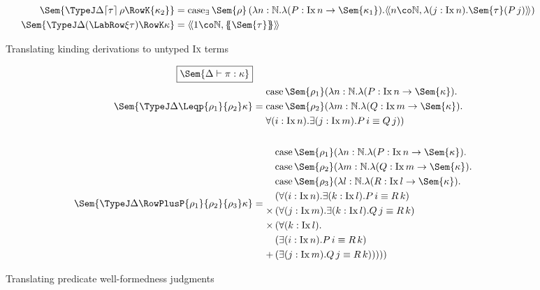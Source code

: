 \documentclass[authoryear,acmsmall,screen]{acmart}
\newcommand\IX{\textsc{Ix}}
\newcommand\Nat{\mathbb{N}}
\newcommand\Ix[1]{\mathrm{Ix} \, #1}
\newcommand\Ixed[1]{\ensuremath{\Sem{#1}}}
\newcommand\TyPair[3]{\ensuremath{\langle\!\langle #1 \co #2 , #3 \rangle\!\rangle}}
\newcommand\Lift[1]{\ensuremath{\lceil #1 \rceil}}
\renewcommand\Case{\mathrm{case}}
\newcommand\CaseP[2]{\ensuremath{\Case_{\mathrm{\exists}} \, #1 \, #2 }}
\newcommand\Felim[1]{\{\!\!\{#1\}\!\!\}}
\begin{document}
\begin{figure}[H]
\begin{gather*}
\begin{align*}
\Ixed{\TypeJ \Delta {\Lift{\tau} \, \rho} {\RowK {\kappa_{2}}}} &= \CaseP {\Ixed \rho} {(\lambda n : \Nat. \lambda (P : \Ix n \to \Sem{\kappa_{1}}).  \TyPair {n} {\Nat} {\lambda (j : \Ix n). \Sem{\tau} (P \, j) })} \\
\Ixed{\TypeJ \Delta {(\LabRow \xi \tau)} {\RowK \kappa}}&= \TyPair {1} {\Nat} {\Felim{\Sem{\tau}}}
\end{align*}
\end{gather*}
\caption{Translating kinding derivations to untyped \IX{} terms}
\label{fig:translation}
\end{figure}

\begin{figure}[H]
\begin{align*}
\fbox{$\Ixed{\Delta \vdash \pi : \kappa}$} \\
\vspace{5em}
\Ixed{\TypeJ \Delta {\Leqp {\rho_{1}} {\rho_{2}}} \kappa} &=
  \begin{aligned}
              &\Case\, {\Ixed{\rho_{1}}} (\lambda n : \Nat. \lambda (P : \Ix n \to \Ixed{\kappa}).  \\
              &\Case\, {\Ixed{\rho_{2}}} (\lambda m : \Nat. \lambda (Q : \Ix m \to \Ixed{\kappa}). \\                               
              &\forall (i : \Ix n). \exists (j : \Ix m). P \, i \equiv Q \, j))
  \end{aligned} \\ \\
\Ixed{\TypeJ \Delta {\RowPlusP {\rho_{1}} {\rho_{2}} {\rho_{3}}} \kappa} &= 
  \begin{aligned}                                           
              &\Case\, {\Ixed{\rho_{1}}} (\lambda n : \Nat. \lambda (P : \Ix n \to \Ixed{\kappa}).  \\
              &\Case\, {\Ixed{\rho_{2}}} (\lambda m : \Nat. \lambda (Q : \Ix m \to \Ixed{\kappa}). \\                               
              &\Case\, {\Ixed{\rho_{3}}} (\lambda l : \Nat. \lambda (R : \Ix l \to \Ixed{\kappa}). \\                               
              &(\forall (i : \Ix n). \exists (k : \Ix l). P \, i \equiv R \, k) \\ 
              \times \, &(\forall (j : \Ix m). \exists (k : \Ix l). Q \, j \equiv R \, k) \\
              \times \, &(\forall (k : \Ix l). \\
                &(\exists (i : \Ix n). P \, i \equiv R\, k) \\
                +\, &(\exists (j : \Ix m). Q \, j \equiv R\, k)))))
  \end{aligned}                                           
\end{align*}
\caption{Translating predicate well-formedness judgments}
\label{fig:translation}
\end{figure}
\end{document}

